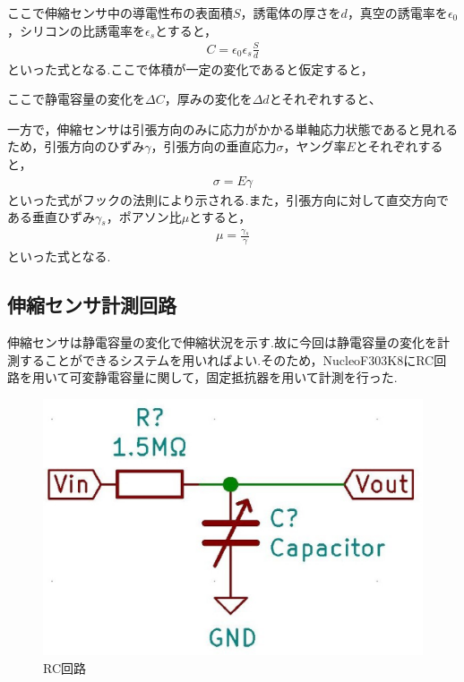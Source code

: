 \newpage

ここで伸縮センサ中の導電性布の表面積$S$，誘電体の厚さを$d$，真空の誘電率を$\epsilon{}_0$，シリコンの比誘電率を$\epsilon{}_s$とすると，
\begin{eqnarray}
    C=\epsilon{}_0\epsilon{}_s\frac{S}{d}
\end{eqnarray}
といった式となる.ここで体積が一定の変化であると仮定すると，

ここで静電容量の変化を$\Delta{}C$，厚みの変化を$\Delta{}d$とそれぞれすると、

一方で，伸縮センサは引張方向のみに応力がかかる単軸応力状態であると見れるため，引張方向のひずみ$\gamma$，引張方向の垂直応力$\sigma$，ヤング率$E$とそれぞれすると，
\begin{eqnarray}
    \sigma=E\gamma
    \label{フックの法則}
\end{eqnarray}
といった式がフックの法則により示される.また，引張方向に対して直交方向である垂直ひずみ$\gamma{}_s$，ポアソン比$\mu$とすると，
\begin{eqnarray}
    \mu = \frac{\gamma{}_s}{\gamma}
    \label{ポアソン比}
\end{eqnarray}
といった式となる.

\subsection{伸縮センサ計測回路}
伸縮センサは静電容量の変化で伸縮状況を示す.故に今回は静電容量の変化を計測することができるシステムを用いればよい.そのため，NucleoF303K8にRC回路を用いて可変静電容量に関して，固定抵抗器を用いて計測を行った.

\begin{figure}[h]
 \begin{center}
  \includegraphics[width=0.75\columnwidth,clip]{Photo/2.実験方法/RC.eps}
  \caption{RC回路}
  \label{RC}
 \end{center}
\end{figure}

